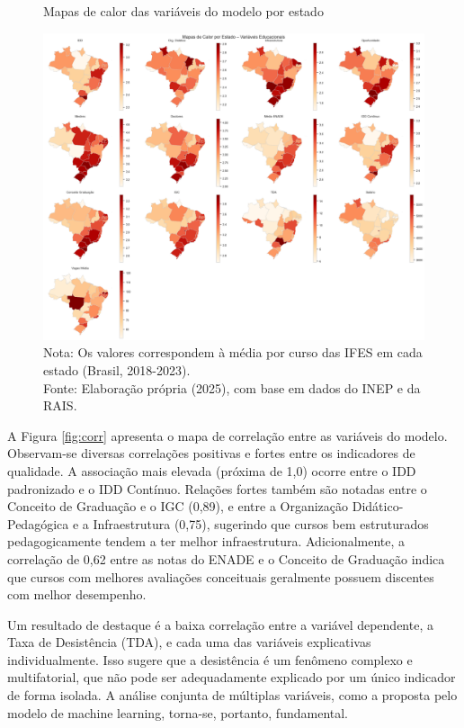 \begin{figure}[H]
    \centering
    \caption{Mapas de calor das variáveis do modelo por estado}
    \label{fig:heatmaps}
    \includegraphics[width=\textwidth]{fig2_heatmaps.png}
    \caption*{Nota: Os valores correspondem à média por curso das IFES em cada estado (Brasil, 2018-2023). \\ Fonte: Elaboração própria (2025), com base em dados do INEP e da RAIS.}
\end{figure}

A Figura \ref{fig:corr} apresenta o mapa de correlação entre as variáveis do modelo. Observam-se diversas correlações positivas e fortes entre os indicadores de qualidade. A associação mais elevada (próxima de 1,0) ocorre entre o IDD padronizado e o IDD Contínuo. Relações fortes também são notadas entre o Conceito de Graduação e o IGC (0,89), e entre a Organização Didático-Pedagógica e a Infraestrutura (0,75), sugerindo que cursos bem estruturados pedagogicamente tendem a ter melhor infraestrutura. Adicionalmente, a correlação de 0,62 entre as notas do ENADE e o Conceito de Graduação indica que cursos com melhores avaliações conceituais geralmente possuem discentes com melhor desempenho.

Um resultado de destaque é a baixa correlação entre a variável dependente, a Taxa de Desistência (TDA), e cada uma das variáveis explicativas individualmente. Isso sugere que a desistência é um fenômeno complexo e multifatorial, que não pode ser adequadamente explicado por um único indicador de forma isolada. A análise conjunta de múltiplas variáveis, como a proposta pelo modelo de machine learning, torna-se, portanto, fundamental.

